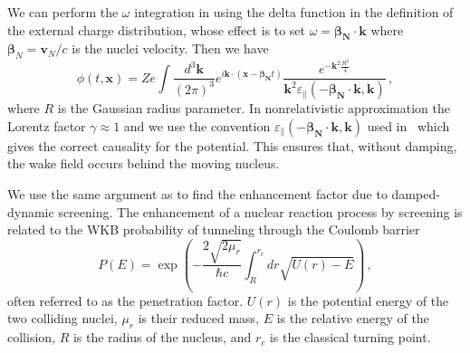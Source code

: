 We can perform the $\omega$ integration in  using the delta function in the definition of the external charge distribution, whose effect is to set $\omega = \boldsymbol{\beta_{\text{N}}}\cdot \boldsymbol{k}$ where $\boldsymbol{\beta}_N = \boldsymbol{v}_N/c$ is the nuclei velocity. Then we have
\begin{equation}\label{eq:potentk}
 \phi(t,\boldsymbol{x}) = Ze\int \frac{d^3\boldsymbol{k}}{(2\pi)^3} e^{ i\boldsymbol{k}\cdot(\boldsymbol{x}-\boldsymbol{\beta_{\text{N}}} t)} \frac{ e^{-\boldsymbol{k}^2\frac{R^2}{4}}}{\boldsymbol{k}^2\varepsilon_\parallel(-\boldsymbol{\beta_{\text{N}}} \cdot \boldsymbol{k},\boldsymbol{k}) }\,,
\end{equation}
where $R$ is the Gaussian radius parameter.
In nonrelativistic approximation the Lorentz factor $\gamma \approx 1$ and we use the convention $\varepsilon_\parallel(-\boldsymbol{\beta_{\text{N}}} \cdot \boldsymbol{k},\boldsymbol{k})$ used in~\cite{Montgomery:1970jpp,Stenflo:1973,Shukla:2002ppcf,Shukla:1996ccc} which gives the correct causality for the potential. This ensures that, without damping, the wake field occurs behind the moving nucleus.

We use the same argument as \cite{Salpeter:1954nc} to find the enhancement factor due to damped-dynamic screening. The enhancement of a nuclear reaction process by screening is related to the WKB probability of tunneling through the Coulomb barrier
\begin{equation} \label{eq:penprob}
    P(E) = \exp{\left( - \frac{2\sqrt{2 \mu_r}}{\hbar c}\int_{R}^{r_c}dr \sqrt{U(r)-E}\right)}\,,
\end{equation}
often referred to as the penetration factor. $U(r)$ is the potential energy of the two colliding nuclei, $\mu_r$ is their reduced mass, $E$ is the relative energy of the collision, $R$ is the radius of the nucleus, and $r_c$ is the classical turning point. 

